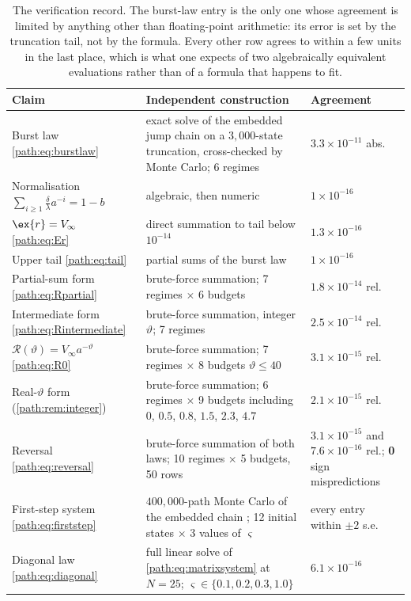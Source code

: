 \begin{table}[tbp]
\centering
\footnotesize
\renewcommand{\arraystretch}{1.15}
\begin{tabular}{@{}p{}p{}p{}@{}}
\toprule
Claim & Independent construction & Agreement \\
\midrule
Burst law \cref{path:eq:burstlaw}
  & exact solve of the embedded jump chain on a $3{,}000$-state truncation,
    cross-checked by Monte Carlo; 6 regimes
  & $3.3\times10^{-11}$ abs. \\
Normalisation $\sum_{i\ge1}\frac{\delta}{\lambda}a^{-i}=1-b$
  & algebraic, then numeric
  & $1\times10^{-16}$ \\
$\ex{r}=V_\infty$ \cref{path:eq:Er}
  & direct summation to tail below $10^{-14}$
  & $1.3\times10^{-16}$ \\
Upper tail \cref{path:eq:tail}
  & partial sums of the burst law
  & $1\times10^{-16}$ \\
Partial-sum form \cref{path:eq:Rpartial}
  & brute-force summation; 7 regimes $\times$ 6 budgets
  & $1.8\times10^{-14}$ rel. \\
Intermediate form \cref{path:eq:Rintermediate}
  & brute-force summation, integer $\vartheta$; 7 regimes
  & $2.5\times10^{-14}$ rel. \\
$\mathcal{R}(\vartheta)=V_\infty a^{-\vartheta}$ \cref{path:eq:R0}
  & brute-force summation;
    7 regimes $\times$ 8 budgets $\vartheta\le40$
  & $3.1\times10^{-15}$ rel. \\
Real-$\vartheta$ form (\cref{path:rem:integer})
  & brute-force summation; 6 regimes $\times$ 9 budgets including
    $0$, $0.5$, $0.8$, $1.5$, $2.3$, $4.7$
  & $2.1\times10^{-15}$ rel. \\
Reversal \cref{path:eq:reversal}
  & brute-force summation of both laws;
    10 regimes $\times$ 5 budgets, 50 rows
  & $3.1\times10^{-15}$ and $7.6\times10^{-16}$ rel.; \textbf{0} sign
    mispredictions \\
First-step system \cref{path:eq:firststep}
  & $400{,}000$-path Monte Carlo of the embedded chain
    \cite{Gillespie1977}; 12 initial states $\times$ 3 values of $\varsigma$
  & every entry within $\pm2$ s.e. \\
Diagonal law \cref{path:eq:diagonal}
  & full linear solve of \cref{path:eq:matrixsystem} at $N=25$;
    $\varsigma\in\{0.1,0.2,0.3,1.0\}$
  & $6.1\times10^{-16}$ \\
\bottomrule
\end{tabular}
\caption{The verification record. The burst-law entry is the only one whose
agreement is limited by anything other than floating-point arithmetic: its
error is set by the truncation tail, not by the formula. Every other row
agrees to within a few units in the last place, which is what one expects of
two algebraically equivalent evaluations rather than of a formula that
happens to fit.}
\label{path:tab:verification}
\end{table}

